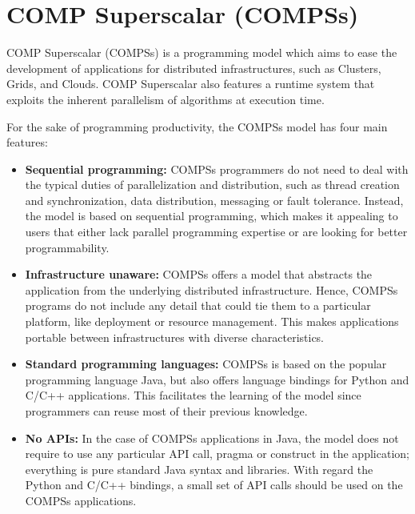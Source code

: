 \section{COMP Superscalar (COMPSs)}
\label{sec:Introduction}

COMP Superscalar (COMPSs) is a programming model which aims to ease the development of 
applications for distributed infrastructures, such as Clusters, Grids, and Clouds. COMP 
Superscalar also features a runtime system that exploits the inherent parallelism of 
algorithms at execution time.

For the sake of programming productivity, the COMPSs model has four main features:


\begin{itemize}

 \item  {\bf Sequential programming:} COMPSs programmers do not need to deal 
 with the typical duties of parallelization and distribution, such as thread 
 creation and synchronization, data distribution, messaging or fault tolerance. 
 Instead, the model is based on sequential programming, which makes it appealing 
 to users that either lack parallel programming expertise or are looking for 
 better programmability.
 
 \item  {\bf Infrastructure unaware:} COMPSs offers a model that abstracts the 
 application from the underlying distributed infrastructure. Hence, COMPSs 
 programs do not include any detail that could tie them to a particular 
 platform, like deployment or resource management. This makes applications 
 portable between infrastructures with diverse characteristics.
 
 \item  {\bf Standard programming languages:} COMPSs is based on the popular 
 programming language Java, but also offers language bindings for Python and 
 C/C++ applications. This facilitates the learning of the model since 
 programmers can reuse most of their previous knowledge.
 
 \item  {\bf No APIs:} In the case of COMPSs applications in Java, the model 
 does not require to use any particular API call, pragma or construct in the 
 application; everything is pure standard Java syntax and libraries. With 
 regard the Python and C/C++ bindings, a small set of API calls should be used 
 on the COMPSs applications.

\end{itemize}

